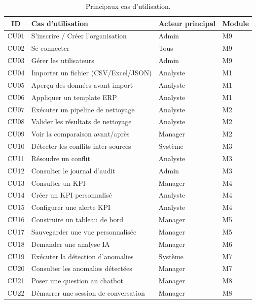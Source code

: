 \begin{table}[h!]
\centering
\caption{Principaux cas d'utilisation.}
\label{tab:cas_utilisation}
\small
\begin{tabular}{|c|l|l|l|}
\hline
\textbf{ID} & \textbf{Cas d'utilisation} & \textbf{Acteur principal} & \textbf{Module} \\
\hline
CU01 & S'inscrire / Créer l'organisation & Admin & M9 \\
CU02 & Se connecter & Tous & M9 \\
CU03 & Gérer les utilisateurs & Admin & M9 \\
\hline
CU04 & Importer un fichier (CSV/Excel/JSON) & Analyste & M1 \\
CU05 & Aperçu des données avant import & Analyste & M1 \\
CU06 & Appliquer un template ERP & Analyste & M1 \\
\hline
CU07 & Exécuter un pipeline de nettoyage & Analyste & M2 \\
CU08 & Valider les résultats de nettoyage & Analyste & M2 \\
CU09 & Voir la comparaison avant/après & Manager & M2 \\
\hline
CU10 & Détecter les conflits inter-sources & Système & M3 \\
CU11 & Résoudre un conflit & Analyste & M3 \\
CU12 & Consulter le journal d'audit & Admin & M3 \\
\hline
CU13 & Consulter un KPI & Manager & M4 \\
CU14 & Créer un KPI personnalisé & Analyste & M4 \\
CU15 & Configurer une alerte KPI & Analyste & M4 \\
\hline
CU16 & Construire un tableau de bord & Manager & M5 \\
CU17 & Sauvegarder une vue personnalisée & Manager & M5 \\
\hline
CU18 & Demander une analyse IA & Manager & M6 \\
CU19 & Exécuter la détection d'anomalies & Système & M7 \\
CU20 & Consulter les anomalies détectées & Manager & M7 \\
\hline
CU21 & Poser une question au chatbot & Manager & M8 \\
CU22 & Démarrer une session de conversation & Manager & M8 \\
\hline
\end{tabular}
\end{table}


